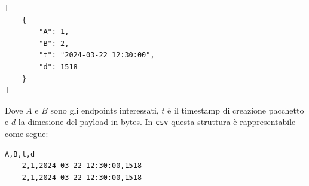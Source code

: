\documentclass[binding=0.6cm]{sapthesis}
\begin{document}
 {\scriptsize %
\begin{lstlisting}[caption={Pacchetto di rete rappresentato in \texttt{json}}, label={fig:packet_example}]
[    
    {
        "A": 1,
        "B": 2,
        "t": "2024-03-22 12:30:00",
        "d": 1518
    }
]
\end{lstlisting}
 }

Dove \(A\) e \(B\) sono gli endpoints interessati, \(t\) è il timestamp di creazione pacchetto e \(d\) 
la dimesione del payload in bytes. In \texttt{csv} questa struttura è rappresentabile come segue:

{\scriptsize %
\begin{lstlisting}[caption={Pacchetti di rete rappresentati in \texttt{csv}}]
    A,B,t,d
    2,1,2024-03-22 12:30:00,1518
    2,1,2024-03-22 12:30:00,1518
\end{lstlisting}
}
\end{document}
